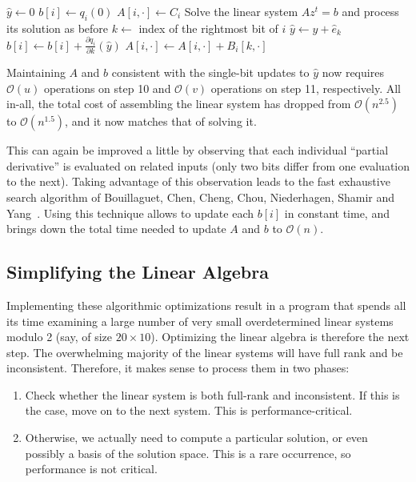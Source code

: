 \documentclass[a4paper,UKenglish,cleveref, autoref]{lipics-v2019}
\newcommand{\bigO}[1]{\ensuremath{\mathcal{O}\left( #1 \right)} }
\begin{document}
  \begin{algorithmic}[1]
    \State $\hat y \gets 0$ 
    \State $b[i] \gets  q_i(0)$
    \State $A[i, \cdot] \gets C_i$
    \EndFor
     
    \State Solve the linear system $Az^t = b$ and process its solution as before
    \State $k \gets $ index of the rightmost bit of $i$ 
    \State $\hat y \gets \hat y + \hat e_k$
     
    \State $b[i] \gets b[i] + \frac{\partial q_i}{\partial k}(\hat y)$
    \State $A[i, \cdot] \gets A[i, \cdot] + B_i[k, \cdot]$
    \EndFor
    \EndFor
  \end{algorithmic}
  
  Maintaining $A$ and $b$ consistent with the single-bit updates to $\hat y$ now
  requires $\bigO{u}$ operations on step 10 and $\bigO{v}$ operations on step
  11, respectively. All in-all, the total cost of assembling the linear system has dropped from
  $\bigO{n^{2.5}}$ to $\bigO{n^{1.5}}$, and it now matches that of solving it.
  
  This can again be improved a little by observing that each individual ``partial
  derivative'' is evaluated on related inputs (only two bits differ from one
  evaluation to the next). Taking advantage of this observation leads to the fast
  exhaustive search algorithm of Bouillaguet, Chen, Cheng, Chou, Niederhagen,
  Shamir and Yang~\cite{BouillaguetCCCNSY10}. Using this technique allows to
  update each $b[i]$ in constant time, and brings down the total time needed to
  update $A$ and $b$ to $\bigO{n}$.
  
  \subsection{Simplifying the Linear Algebra}
  
  Implementing these algorithmic optimizations result in a program that spends all
  its time examining a large number of very small overdetermined linear systems
  modulo 2 (say, of size $20 \times 10$). Optimizing the linear algebra is
  therefore the next step. The overwhelming majority of the linear systems will
  have full rank and be inconsistent. Therefore, it makes sense to process them in
  two phases:
  \begin{enumerate}
    \item Check whether the linear system is both full-rank and inconsistent. If
    this is the case, move on to the next system. This is performance-critical.
    \item Otherwise, we actually need to compute a particular solution, or even
    possibly a basis of the solution space. This is a rare occurrence, so
    performance is not critical.
  \end{enumerate}
  
\end{document}
